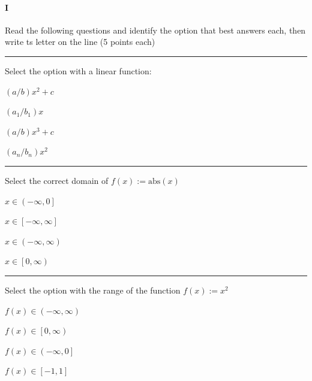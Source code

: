 
\paragraph{I} Read the following questions and identify the option that best answers each, then write ts letter on the line (5 points each)

\begin{preguntas}

\pregunta[5] \rule{1cm}{0.1mm} Select the option with a linear function:

\begin{enumerate*}[label=(\alph*)]
    \item $(a/b)x^2 + c\qquad$
    \item $\boxed{(a_1/b_1)x} \qquad$
    \item $(a/b)x^3 + c\qquad$
    \item $(a_n/b_n)x^2\qquad$
\end{enumerate*}

\pregunta[5] \rule{1cm}{0.1mm} Select the correct domain of $f(x):=\mathrm{abs}(x)$

\begin{enumerate*}[label=(\alph*)]
    \item $x\in\left(-\infty,0\right]\qquad$
    \item $x\in\left[-\infty,\infty\right]\qquad$
    \item $\boxed{x\in\left(-\infty,\infty\right)}\qquad$
    \item $x\in\left[0,\infty\right)\qquad$
\end{enumerate*}

\pregunta[5] \rule{1cm}{0.1mm} Select the option with the range of the function $f(x):=x^2$

\begin{enumerate*}[label=(\alph*)]
    \item $f(x)\in\left(-\infty,\infty\right)\qquad$
    \item $\boxed{f(x)\in\left[0,\infty\right)}\qquad$
    \item $f(x)\in\left(-\infty,0\right]\qquad$
    \item $f(x)\in\left[-1,1\right]\qquad$
\end{enumerate*}


\end{preguntas}
